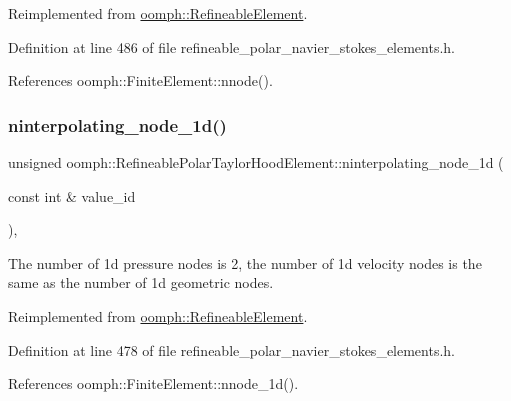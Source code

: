 Reimplemented from \hyperlink{classoomph_1_1RefineableElement_a8b1b5031b55141567ba24913a21534f4}{oomph\+::\+Refineable\+Element}.



Definition at line 486 of file refineable\+\_\+polar\+\_\+navier\+\_\+stokes\+\_\+elements.\+h.



References oomph\+::\+Finite\+Element\+::nnode().

\mbox{\label{classoomph_1_1RefineablePolarTaylorHoodElement_a24cc791779fb7eb9c46875b242715345}} 
\subsubsection{\texorpdfstring{ninterpolating\+\_\+node\+\_\+1d()}{ninterpolating\_node\_1d()}}
{\footnotesize\ttfamily unsigned oomph\+::\+Refineable\+Polar\+Taylor\+Hood\+Element\+::ninterpolating\+\_\+node\+\_\+1d (\begin{DoxyParamCaption}\item[{const int \&}]{value\+\_\+id }\end{DoxyParamCaption})\hspace{0.3cm}{\ttfamily [inline]}, {\ttfamily [virtual]}}



The number of 1d pressure nodes is 2, the number of 1d velocity nodes is the same as the number of 1d geometric nodes. 



Reimplemented from \hyperlink{classoomph_1_1RefineableElement_a850180084aaf164550b4f4978b42cda7}{oomph\+::\+Refineable\+Element}.



Definition at line 478 of file refineable\+\_\+polar\+\_\+navier\+\_\+stokes\+\_\+elements.\+h.



References oomph\+::\+Finite\+Element\+::nnode\+\_\+1d().

\mbox{\label{classoomph_1_1RefineablePolarTaylorHoodElement_ace9784b01dd7184410c22588334238e0}} 
